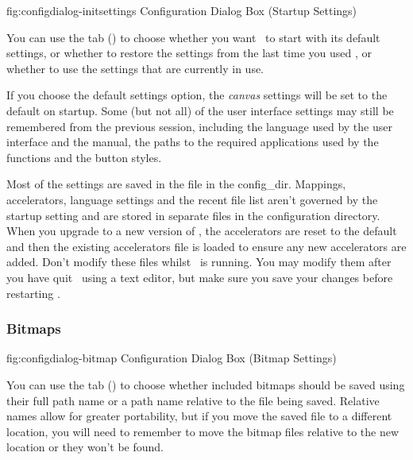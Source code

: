 
\FloatFig
  {fig:configdialog-initsettings}
  {}
  {Configuration Dialog Box (Startup Settings)}

You can use the  tab
()
to choose whether you want \FlowframTk\ to start with its
default settings, or whether to restore the settings from the last
time you used \FlowframTk, or whether to use the settings that are
currently in use.

If you choose the default settings option, the \emph{\gls{canvas}}
settings will be set to the default on startup.  Some (but not all)
of the user interface settings may still be remembered from the
previous session, including the language used by the user interface
and the manual, the paths to the required applications used by the
 functions and the button styles.

Most of the settings are saved in the file  in the
\gls{config_dir}.  Mappings,
accelerators, language settings and the recent file list aren't
governed by the startup setting and are stored in separate files in
the configuration directory. When you upgrade to a new version of
\FlowframTk, the accelerators are reset to the default and then the
existing accelerators file is loaded to ensure any new accelerators
are added. Don't modify these files whilst \FlowframTk\ is running.
You may modify them after you have quit \FlowframTk\ using a text
editor, but make sure you save your changes before restarting
\FlowframTk.


\subsubsection{Bitmaps}\label{sec:bitmapconfig}


\FloatFig
  {fig:configdialog-bitmap}
  {}
  {Configuration Dialog Box (Bitmap Settings)}

You can use the  tab
()
to choose whether included \glspl{bitmap} should be
saved using their full path name or a path name relative to the
file being saved. Relative names allow for greater portability, but
if you move the saved file to a different location, you will need to
remember to move the bitmap files relative to the new location or
they won't be found.

